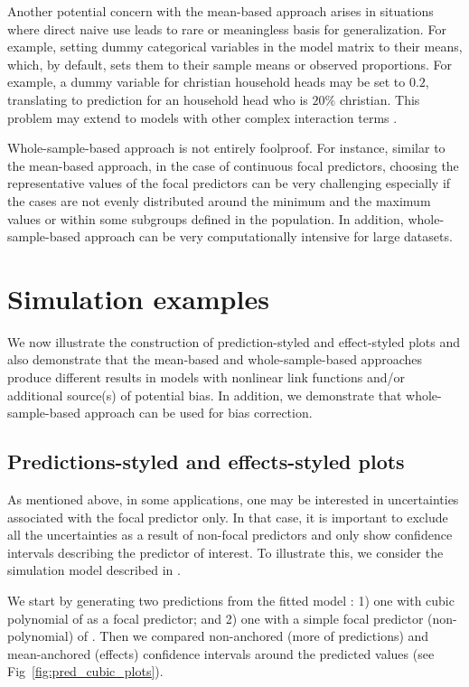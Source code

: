 Another potential concern with the mean-based approach arises in situations where direct naive use leads to rare or meaningless basis for generalization. For example, setting dummy categorical variables in the model matrix to their means, which, by default, sets them to their sample means or observed proportions. For example, a dummy variable for christian household heads may be set to $0.2$, translating to prediction for an household head who is $20\%$ christian. This problem may extend to models with other complex interaction terms \citep{hanmer2013behind}.

Whole-sample-based approach is not entirely foolproof. For instance, similar to the mean-based approach, in the case of continuous focal predictors, choosing the representative values of the focal predictors can be very challenging especially if the cases are not evenly distributed around the minimum and the maximum values or within some subgroups defined in the population. In addition, whole-sample-based approach can be very computationally intensive for large datasets.

\section*{Simulation examples}

We now illustrate the construction of prediction-styled and effect-styled plots and also demonstrate that the mean-based and whole-sample-based approaches produce different results in models with nonlinear link functions and/or additional source(s) of potential bias. In addition, we demonstrate that whole-sample-based approach can be used for bias correction.

\subsection*{Predictions-styled and effects-styled plots}

As mentioned above, in some applications, one may be interested in uncertainties associated with the focal predictor only. In that case, it is important to exclude all the uncertainties as a result of non-focal predictors and only show confidence intervals describing the predictor of interest. To illustrate this, we consider the simulation model described in . 

We start by generating two predictions from the fitted model : 1) one with cubic polynomial of  as a focal predictor; and 2) one with a simple focal predictor (non-polynomial) of . Then we compared non-anchored (more of predictions) and mean-anchored (effects) confidence intervals around the predicted values (see Fig~\ref{fig:pred_cubic_plots}).

